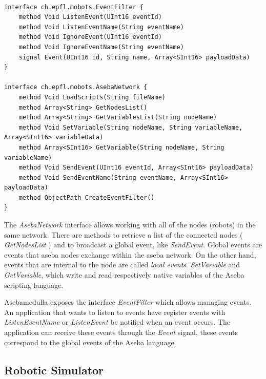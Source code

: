 \begin{lstlisting}[style=C-color, caption={The API that asebamedulla provides over D-Bus},label={Asebamedulla API}]

interface ch.epfl.mobots.EventFilter {
    method Void ListenEvent(UInt16 eventId)
    method Void ListenEventName(String eventName)
    method Void IgnoreEvent(UInt16 eventId)
    method Void IgnoreEventName(String eventName)
    signal Event(UInt16 id, String name, Array<SInt16> payloadData)
}

interface ch.epfl.mobots.AsebaNetwork {
    method Void LoadScripts(String fileName)
    method Array<String> GetNodesList()
    method Array<String> GetVariablesList(String nodeName)
    method Void SetVariable(String nodeName, String variableName, Array<SInt16> variableData)
    method Array<SInt16> GetVariable(String nodeName, String variableName)
    method Void SendEvent(UInt16 eventId, Array<SInt16> payloadData)
    method Void SendEventName(String eventName, Array<SInt16> payloadData)
    method ObjectPath CreateEventFilter()
}
\end{lstlisting}

The \emph{AsebaNetwork} interface allows working with all of the nodes (robots) in the same network. There are methods to retrieve a list of the connected nodes ( \emph{GetNodesList} ) and to broadcast a global event, like \emph{SendEvent}. Global events are events that aseba nodes exchange within the aseba network. On the other hand, events that are internal to the node are called \emph{local events}. \emph{SetVariable} and \emph{GetVariable}, which write and read respectively native variables of the Aseba scripting language.

Asebamedulla exposes the interface \emph{EventFilter} which allows managing events. An application that wants to listen to events have register events with \emph{ListenEventName} or \emph{ListenEvent} be notified when an event occurs. The application can receive these events through the \emph{Event} signal, these events correspond to the global events of the Aseba language.

\subsection{Robotic Simulator}

